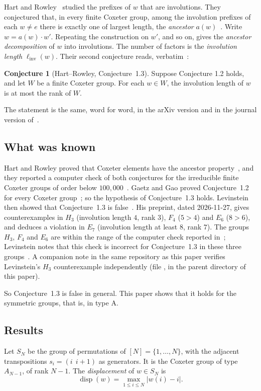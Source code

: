 \documentclass[11pt]{amsart}
\theoremstyle{definition}
\newtheorem*{conjecture*}{Conjecture}
\theoremstyle{remark}
\numberwithin{equation}{section}
\newcommand{\linv}{\ell_{\mathrm{inv}}}
\newcommand{\abs}[1]{\lvert #1\rvert}
\DeclareMathOperator{\disp}{disp}
\begin{document}
Hart and Rowley~\cite{HR} studied the prefixes of \(w\) that are involutions. They conjectured that, in every finite Coxeter group, among the involution prefixes of each \(w\neq e\) there is exactly one of largest length, the \emph{ancestor} \(a(w)\)~\cite[Conj.~1.2]{HR}. Write \(w=a(w)\cdot w'\). Repeating the construction on \(w'\), and so on, gives the \emph{ancestor decomposition} of \(w\) into involutions. The number of factors is the \emph{involution length} \(\linv(w)\). Their second conjecture reads, verbatim~\cite[Conj.~1.3]{HR}:

\begin{conjecture*}[Hart--Rowley, Conjecture~1.3]
Suppose Conjecture 1.2 holds, and let \(W\) be a finite Coxeter group. For each \(w \in W\), the involution length of \(w\) is at most the rank of \(W\).
\end{conjecture*}

The statement is the same, word for word, in the arXiv version and in the journal version of~\cite{HR}.

\subsection{What was known}
Hart and Rowley proved that Coxeter elements have the ancestor property~\cite[Prop.~2.2]{HR}, and they reported a computer check of both conjectures for the irreducible finite Coxeter groups of order below \(100{,}000\)~\cite[\S3]{HR}. Gaetz and Gao proved Conjecture~1.2 for every Coxeter group~\cite[Cor.~1.2]{GG}; so the hypothesis of Conjecture~1.3 holds. Levinstein then showed that Conjecture~1.3 is false~\cite{Lev}. His preprint, dated 2026-11-27, gives counterexamples in \(H_3\) (involution length \(4\), rank \(3\)), \(F_4\) (\(5>4\)) and \(E_6\) (\(8>6\)), and deduces a violation in \(E_7\) (involution length at least \(8\), rank \(7\)). The groups \(H_3\), \(F_4\) and \(E_6\) are within the range of the computer check reported in~\cite[\S3]{HR}; Levinstein notes that this check is incorrect for Conjecture~1.3 in these three groups~\cite{Lev}. A companion note in the same repository as this paper verifies Levinstein's \(H_3\) counterexample independently (file , in the parent directory of this paper).

So Conjecture~1.3 is false in general. This paper shows that it holds for the symmetric groups, that is, in type A.

\subsection{Results}
Let \(S_N\) be the group of permutations of \([N]=\{1,\dots,N\}\), with the adjacent transpositions \(s_i=(i\ \ i+1)\) as generators. It is the Coxeter group of type \(A_{N-1}\), of rank \(N-1\). The \emph{displacement} of \(w\in S_N\) is
\begin{equation}\label{eq:disp}
\disp(w)=\max_{1\le i\le N}\abs{w(i)-i}.
\end{equation}
\end{document}
